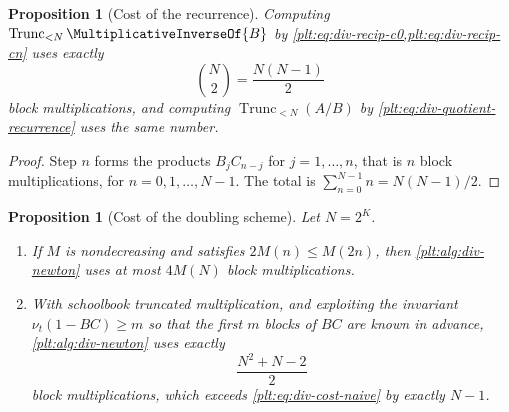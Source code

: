 \documentclass[11pt,oneside]{article}
\theoremstyle{plain}
\newtheorem{proposition}[theorem]{Proposition}
\theoremstyle{definition}
\theoremstyle{remark}
\newcommand{\ordt}{\nu_{t}}                              %
\newcommand{\Trunc}[2]{\operatorname{Trunc}_{<#2}#1}     %
\newcommand{\recip}[1]{\MultiplicativeInverseOf{#1}}
\begin{document}
\begin{proposition}[Cost of the recurrence]\label{plt:prop:div-cost-naive}
Computing \(\Trunc{\recip{B}}{N}\) by
\cref{plt:eq:div-recip-c0,plt:eq:div-recip-cn} uses exactly
\begin{equation}\label{plt:eq:div-cost-naive}
  \binom{N}{2}=\frac{N(N-1)}{2}
\end{equation}
block multiplications, and computing \(\Trunc{(A/B)}{N}\) by
\cref{plt:eq:div-quotient-recurrence} uses the same number.
\end{proposition}

\begin{proof}
Step \(n\) forms the products \(B_{j}C_{n-j}\) for \(j=1,\dots,n\), that is
\(n\) block multiplications, for \(n=0,1,\dots,N-1\).  The total is
\(\sum_{n=0}^{N-1}n=N(N-1)/2\).
\end{proof}

\begin{proposition}[Cost of the doubling scheme]
\label{plt:prop:div-cost-newton}
Let \(N=2^{K}\).
\begin{enumerate}
\item If \(M\) is nondecreasing and satisfies \(2M(n)\le M(2n)\), then
      \cref{plt:alg:div-newton} uses at most \(4M(N)\) block multiplications.
\item With schoolbook truncated multiplication, and exploiting the invariant
      \(\ordt(1-BC)\ge m\) so that the first \(m\) blocks of \(BC\) are known
      in advance, \cref{plt:alg:div-newton} uses exactly
      \begin{equation}\label{plt:eq:div-cost-newton-exact}
        \frac{N^{2}+N-2}{2}
      \end{equation}
      block multiplications, which exceeds
      \cref{plt:eq:div-cost-naive} by exactly \(N-1\).
\end{enumerate}
\end{proposition}
\end{document}

